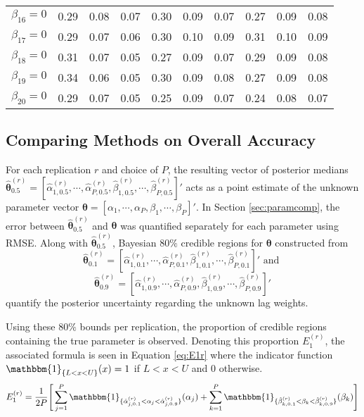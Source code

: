\begin{table}[htbp]
\begin{tabular}{l|ccc|ccc|ccc}
  $\beta_{16}=0$ & 0.29 & 0.08 & 0.07 & 0.30 & 0.09 & 0.07 & 0.27 & 0.09 & 0.08 \\ 
  $\beta_{17}=0$ & 0.29 & 0.07 & 0.06 & 0.30 & 0.10 & 0.09 & 0.31 & 0.10 & 0.09 \\ 
  $\beta_{18}=0$ & 0.31 & 0.07 & 0.05 & 0.27 & 0.09 & 0.07 & 0.29 & 0.09 & 0.08 \\ 
  $\beta_{19}=0$ & 0.34 & 0.06 & 0.05 & 0.30 & 0.09 & 0.08 & 0.27 & 0.09 & 0.08 \\ 
  $\beta_{20}=0$ & 0.29 & 0.07 & 0.05 & 0.25 & 0.09 & 0.07 & 0.24 & 0.08 & 0.07 \\ 
\hline
\end{tabular}
\label{tab:rmseP20b}
\end{table}


\subsection{Comparing Methods on Overall Accuracy}
For each replication $r$ and choice of $P$, the resulting vector of posterior medians $\hat{\bm{\theta}}^{(r)}_{0.5}=[\hat{\alpha}^{(r)}_{1,0.5},\cdots,\hat{\alpha}^{(r)}_{P,0.5},\hat{\beta}^{(r)}_{1,0.5},\cdots,\hat{\beta}^{(r)}_{P,0.5}]'$ acts as a point estimate of the unknown parameter vector $\bm{\theta}=[\alpha_1,\cdots,\alpha_P,\beta_1,\cdots,\beta_P]'$. In Section \ref{sec:paramcomp}, the error between $\hat{\bm{\theta}}^{(r)}_{0.5}$ and $\bm{\theta}$ was quantified separately for each parameter using RMSE. Along with $\hat{\bm{\theta}}^{(r)}_{0.5}$, Bayesian $80\%$ credible regions for $\bm{\theta}$ constructed from $$\hat{\bm{\theta}}^{(r)}_{0.1}=[\hat{\alpha}^{(r)}_{1,0.1},\cdots,\hat{\alpha}^{(r)}_{P,0.1},\hat{\beta}^{(r)}_{1,0.1},\cdots,\hat{\beta}^{(r)}_{P,0.1}]' \textrm{  and }$$ $$\bm{\hat{\theta}}^{(r)}_{0.9}=[\hat{\alpha}^{(r)}_{1,0.9},\cdots,\hat{\alpha}^{(r)}_{P,0.9},\hat{\beta}^{(r)}_{1,0.9},\cdots,\hat{\beta}^{(r)}_{P,0.9}]'$$ quantify the posterior uncertainty regarding the unknown lag weights. 

Using these $80\%$ bounds per replication, the proportion of credible regions containing the true parameter is observed. Denoting this proportion $E_1^{(r)}$, the associated formula is seen in Equation \ref{eq:E1r} where the indicator function $\mathbbm{1}_{\{L< x <U\}}(x)=1$ if $L<x<U$ and $0$ otherwise.
\begin{equation}
	\label{eq:E1r}
	\begin{split}
	E^{(r)}_1&=\frac{1}{2P}\Bigg[\sum\limits_{j=1}^P \mathbbm{1}_{\{ \hat{\alpha}^{(r)}_{j,0.1}<\alpha_j<\hat{\alpha}^{(r)}_{j,0.9}  \}} (\alpha_j) + \sum\limits_{k=1}^P \mathbbm{1}_{\{ \hat{\beta}^{(r)}_{k,0.1}<\beta_k<\hat{\beta}^{(r)}_{k,0.9}  \}} (\beta_k)\Bigg]\\
	\end{split}
\end{equation}

